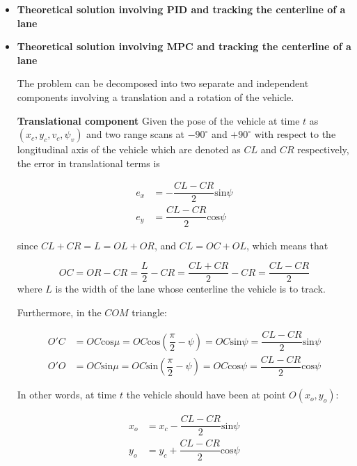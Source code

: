 \documentclass[oneside,12pt]{article}
\begin{document}
\begin{itemize}
  \item \textbf{Theoretical solution involving PID and tracking the centerline of a lane}

  \item \textbf{Theoretical solution involving MPC and tracking the centerline of a lane}

    The problem can be decomposed into two separate and independent
    components involving a translation and a rotation of the vehicle.


    \textbf{Translational component} Given the pose of the vehicle at time $t$
    as $(x_c, y_c, v_c, \psi_v)$ and two range scans at $-90^\circ$ and
    $+90^\circ$ with respect to the longitudinal axis of the vehicle which are
    denoted as $CL$ and $CR$ respectively, the error in translational terms is

    \begin{align}
      e_x &= -\dfrac{CL-CR}{2}\text{sin}\psi \\
      e_y &= \dfrac{CL-CR}{2}\text{cos}\psi
    \end{align}

    since $CL + CR = L = OL + OR$, and $CL = OC + OL$, which means that

    \begin{equation}
      OC = OR - CR = \dfrac{L}{2} - CR = \dfrac{CL + CR}{2} - CR = \dfrac{CL-CR}{2}
    \end{equation}
    where $L$ is the width of the lane whose centerline the vehicle is to track.

    Furthermore, in the $COM$ triangle:

    \begin{align}
      O'C &= OC \text{cos}\mu = OC \text{cos}(\dfrac{\pi}{2} - \psi) = OC \text{sin}\psi = \dfrac{CL-CR}{2} \text{sin}\psi\\
      O'O &= OC \text{sin}\mu = OC \text{sin}(\dfrac{\pi}{2} - \psi) = OC \text{cos}\psi = \dfrac{CL-CR}{2} \text{cos}\psi
    \end{align}

    In other words, at time $t$ the vehicle should have been at point $O(x_o, y_o)$:

    \begin{align}
      x_o &=x_c - \dfrac{CL-CR}{2}\text{sin}\psi \\
      y_o &=y_c + \dfrac{CL-CR}{2}\text{cos}\psi
    \end{align}


\end{itemize}
\end{document}
